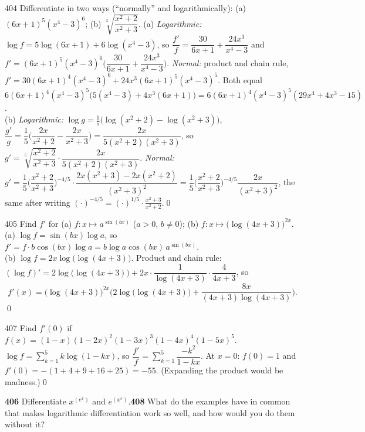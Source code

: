 \begin{bookex}{404}
Differentiate in two ways (``normally'' and logarithmically): (a) $(6x+1)^5(x^4-3)^6$; (b) $\sqrt[5]{\dfrac{x^2+2}{x^2+3}}$.
\solution
(a) \emph{Logarithmic:} $\log f=5\log(6x+1)+6\log(x^4-3)$, so $\dfrac{f'}f=\dfrac{30}{6x+1}+\dfrac{24x^3}{x^4-3}$ and $f'=(6x+1)^5(x^4-3)^6\Big(\dfrac{30}{6x+1}+\dfrac{24x^3}{x^4-3}\Big)$. \emph{Normal:} product and chain rule, $f'=30(6x+1)^4(x^4-3)^6+24x^3(6x+1)^5(x^4-3)^5$. Both equal $6(6x+1)^4(x^4-3)^5\big(5(x^4-3)+4x^3(6x+1)\big)=6(6x+1)^4(x^4-3)^5(29x^4+4x^3-15)$.\\
(b) \emph{Logarithmic:} $\log g=\frac15\big(\log(x^2+2)-\log(x^2+3)\big)$, $\dfrac{g'}g=\dfrac15\Big(\dfrac{2x}{x^2+2}-\dfrac{2x}{x^2+3}\Big)=\dfrac{2x}{5(x^2+2)(x^2+3)}$, so $g'=\sqrt[5]{\dfrac{x^2+2}{x^2+3}}\cdot\dfrac{2x}{5(x^2+2)(x^2+3)}$. \emph{Normal:} $g'=\dfrac15\Big(\dfrac{x^2+2}{x^2+3}\Big)^{-4/5}\cdot\dfrac{2x(x^2+3)-2x(x^2+2)}{(x^2+3)^2}=\dfrac15\Big(\dfrac{x^2+2}{x^2+3}\Big)^{-4/5}\dfrac{2x}{(x^2+3)^2}$, the same after writing $(\cdot)^{-4/5}=(\cdot)^{1/5}\cdot\frac{x^2+3}{x^2+2}$.\qed
\end{bookex}

\begin{bookex}{405}
Find $f'$ for (a) $f:x\mapsto a^{\sin(bx)}$ ($a>0$, $b\ne0$); (b) $f:x\mapsto\big(\log(4x+3)\big)^{2x}$.
\solution
(a) $\log f=\sin(bx)\log a$, so $f'=f\cdot b\cos(bx)\log a=b\log a\cos(bx)\,a^{\sin(bx)}$.\\
(b) $\log f=2x\log\big(\log(4x+3)\big)$. Product and chain rule: $(\log f)'=2\log\big(\log(4x+3)\big)+2x\cdot\dfrac1{\log(4x+3)}\cdot\dfrac4{4x+3}$, so
\[
f'(x)=\big(\log(4x+3)\big)^{2x}\Big(2\log\big(\log(4x+3)\big)+\frac{8x}{(4x+3)\log(4x+3)}\Big).
\]\qed
\end{bookex}

\begin{bookex}{407}
Find $f'(0)$ if $f(x)=(1-x)(1-2x)^2(1-3x)^3(1-4x)^4(1-5x)^5$.
\solution
$\log f=\sum_{k=1}^5k\log(1-kx)$, so $\dfrac{f'}f=\sum_{k=1}^5\dfrac{-k^2}{1-kx}$. At $x=0$: $f(0)=1$ and $f'(0)=-(1+4+9+16+25)=-55$. (Expanding the product would be madness.)\qed
\end{bookex}

\begin{trybox}[{406, 408}]
\textbf{406} Differentiate $x^{(e^x)}$ and $e^{(x^e)}$.\quad \textbf{408} What do the examples have in common that makes logarithmic differentiation work so well, and how would you do them without it?
\end{trybox}

